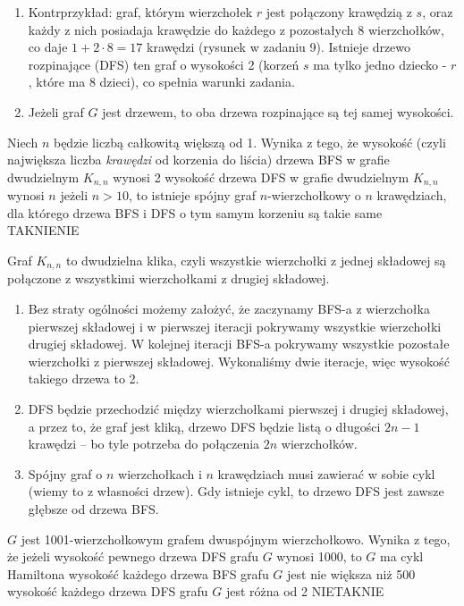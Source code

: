 \begin{solutions}
\begin{enumerate}[\bf A.]
        \item Kontrprzykład: graf, którym wierzchołek $r$ jest połączony krawędzią z $s$, oraz każdy z nich posiadaja krawędzie do każdego z pozostałych 8 wierzchołków, co daje $1 + 2 \cdot 8 = 17$ krawędzi (rysunek w zadaniu 9). Istnieje drzewo rozpinające (DFS) ten graf o wysokości 2 (korzeń $s$ ma tylko jedno dziecko - $r$, które ma 8 dzieci), co spełnia warunki zadania.
        
        \item Jeżeli graf $G$ jest drzewem, to oba drzewa rozpinające są tej samej wysokości.
    \end{enumerate}

    \sol Niech $n$ będzie liczbą całkowitą większą od 1. Wynika z tego, że
    \answerss
    {wysokość (czyli największa liczba \emph{krawędzi} od korzenia do liścia) drzewa BFS w grafie dwudzielnym $K_{n,n}$ wynosi 2}
    {wysokość drzewa DFS w grafie dwudzielnym $K_{n,n}$ wynosi $n$}
    {jeżeli $n > 10$, to istnieje spójny graf $n$-wierzchołkowy o $n$ krawędziach, dla którego drzewa BFS i DFS o tym samym korzeniu są takie same}
    {TAK}{NIE}{NIE}
    
    Graf $K_{n,n}$ to dwudzielna klika, czyli wszystkie wierzchołki z jednej składowej są połączone z wszystkimi wierzchołkami z drugiej składowej.

    \begin{enumerate}[\bf A.]
        \item Bez straty ogólności możemy założyć, że zaczynamy BFS-a z wierzchołka pierwszej składowej i w pierwszej iteracji pokrywamy wszystkie wierzchołki drugiej składowej. W kolejnej iteracji BFS-a pokrywamy wszystkie pozostałe wierzchołki z pierwszej składowej. Wykonaliśmy dwie iteracje, więc wysokość takiego drzewa to 2.

        \item DFS będzie przechodzić między wierzchołkami pierwszej i drugiej składowej, a przez to, że graf jest kliką, drzewo DFS będzie listą o długości $2n-1$ krawędzi -- bo tyle potrzeba do połączenia $2n$ wierzchołków.

        \item Spójny graf o $n$ wierzchołkach i $n$ krawędziach musi zawierać w sobie cykl (wiemy to z własności drzew). Gdy istnieje cykl, to drzewo DFS jest zawsze głębsze od drzewa BFS.
    \end{enumerate}

    \sol $G$ jest 1001-wierzchołkowym grafem dwuspójnym wierzchołkowo. Wynika z tego, że
    \answerss
    {jeżeli wysokość pewnego drzewa DFS grafu $G$ wynosi 1000, to $G$ ma cykl Hamiltona}
    {wysokość każdego drzewa BFS grafu $G$ jest nie większa niż 500}
    {wysokość każdego drzewa DFS grafu $G$ jest różna od 2}
    {NIE}{TAK}{NIE}


\end{solutions}
